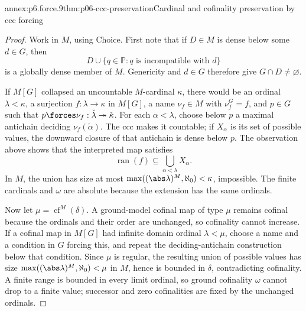 \begin{annexitem}{annex:p6.force.9}{thm:p06-ccc-preservation}{Cardinal and cofinality preservation by ccc forcing}
\begin{proof}
Work in \(M\), using Choice.  First note that if \(D\in M\) is dense below
some \(d\in G\), then
\[
  D\cup\{q\in\mathbb P:q\text{ is incompatible with }d\}
\]
is a globally dense member of \(M\).  Genericity and \(d\in G\) therefore
give \(G\cap D\neq\varnothing\).

If \(M[G]\) collapsed an uncountable
\(M\)-cardinal \(\kappa\), there would be an ordinal
\(\lambda<\kappa\), a surjection \(f:\lambda\to\kappa\) in \(M[G]\), a
name \(\nu_f\in M\) with \(\nu_f^G=f\), and \(p\in G\) such that
\(p\forces \nu_f:\check\lambda\twoheadrightarrow\check\kappa\).  For each
\(\alpha<\lambda\), choose below \(p\) a maximal antichain deciding
\(\nu_f(\check\alpha)\).  The ccc makes it countable; if \(X_\alpha\) is its set
of possible values, the downward closure of that antichain is dense below
\(p\).  The observation above shows that the interpreted map satisfies
\[
  \operatorname{ran}(f)\subseteq
  \bigcup_{\alpha<\lambda}X_\alpha.
\]
In \(M\), the union has size at
most \(\max((\abs\lambda)^M,\aleph_0)<\kappa\), impossible.  The finite cardinals
and \(\omega\) are absolute because the extension has the same ordinals.

Now let \(\mu=\operatorname{cf}^{M}(\delta)\).  A ground-model cofinal map
of type \(\mu\) remains cofinal because the ordinals and their order are
unchanged, so cofinality cannot increase.  If a cofinal map in \(M[G]\) had
infinite domain ordinal \(\lambda<\mu\), choose a name and a condition in
\(G\) forcing this, and repeat the deciding-antichain construction below that
condition.  Since \(\mu\) is regular, the resulting union of possible values
has size \(\max((\abs\lambda)^M,\aleph_0)<\mu\) in \(M\), hence is bounded in
\(\delta\), contradicting cofinality.  A finite range is bounded in every
limit ordinal, so ground cofinality \(\omega\) cannot drop to a finite value;
successor and zero cofinalities are fixed by the unchanged ordinals.
\end{proof}
\end{annexitem}

